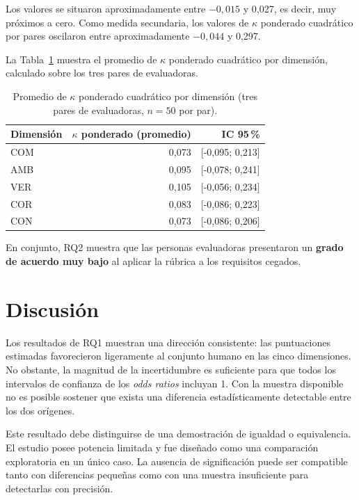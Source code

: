 \documentclass[runningheads]{llncs}
\begin{document}
Los valores se situaron aproximadamente entre $-0,015$ y 0,027, es decir, muy
pr\'oximos a cero. Como medida secundaria, los valores de $\kappa$ ponderado
cuadr\'atico por pares oscilaron entre aproximadamente $-0,044$ y 0,297.

La Tabla~\ref{tab:kappa} muestra el promedio de $\kappa$ ponderado cuadr\'atico
por dimensi\'on, calculado sobre los tres pares de evaluadoras.

\begin{table}[ht]
\centering
\caption{Promedio de $\kappa$ ponderado cuadr\'atico por dimensi\'on (tres pares de evaluadoras, $n=50$ por par).}
\label{tab:kappa}
\begin{tabular}{lrr}
\hline
Dimensi\'on & $\kappa$ ponderado (promedio) & IC 95\,\% \\
\hline
COM & 0,073 & [-0,095; 0,213] \\
AMB & 0,095 & [-0,078; 0,241] \\
VER & 0,105 & [-0,056; 0,234] \\
COR & 0,083 & [-0,086; 0,223] \\
CON & 0,073 & [-0,086; 0,206] \\
\hline
\end{tabular}
\end{table}

En conjunto, RQ2 muestra que las personas evaluadoras presentaron un
\textbf{grado de acuerdo muy bajo} al aplicar la r\'ubrica a los requisitos
cegados.

\section{Discusi\'on}
\label{sec:discusion}

Los resultados de RQ1 muestran una direcci\'on consistente: las puntuaciones
estimadas favorecieron ligeramente al conjunto humano en las cinco dimensiones.
No obstante, la magnitud de la incertidumbre es suficiente para que todos los
intervalos de confianza de los \emph{odds ratios} incluyan 1. Con la muestra
disponible no es posible sostener que exista una diferencia estad\'isticamente
detectable entre los dos or\'igenes.

Este resultado debe distinguirse de una demostraci\'on de igualdad o equivalencia.
El estudio posee potencia limitada y fue dise\~nado como una comparaci\'on
exploratoria en un \'unico caso. La ausencia de significaci\'on puede ser
compatible tanto con diferencias peque\~nas como con una muestra insuficiente para
detectarlas con precisi\'on.
\end{document}

